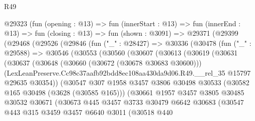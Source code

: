 \begin{lexlean}{R49}
\begin{coremodule}
      @29323
        (fun (opening : @13) =>
        fun (innerStart : @13) =>
        fun (innerEnd : @13) =>
        fun (closing : @13) =>
        fun (shown : @3091) =>
        @29371
          (@29399
            (@29468
              (@29526
                (@29846
                  (fun ("_" : @28427) =>
                  @30336
                    (@30478
                      (fun ("_" : @29588) =>
                      @30546
                        (@30553
                          (@30560
                            (@30607
                              (@30613
                                (@30619
                                  (@30631
                                    (@30637
                                      (@30648
                                        (@30660 (@30672 (@30678 @30683 @30600)))
                                        (LexLeanPreserve.Cc98c37aafb92bdd8ec108aa430da9d06.R49.__rel_35
                                          @15797
                                          @29635
                                          @30354))
                                      (@30547
                                        @307
                                        @1958
                                        @3457
                                        @3806
                                        @30498
                                        @30533
                                        (@30582 @165 @30498 (@3628 (@30585 @165)))
                                        (@30661
                                          @1957
                                          @3457
                                          @3805
                                          @30485
                                          @30532
                                          @30671
                                          (@30673
                                            @445
                                            @3457
                                            @3733
                                            @30479
                                            @6642
                                            @30683
                                            (@30547
                                              @443
                                              @315
                                              @3459
                                              @3457
                                              @6640
                                              @3011
                                              (@30518
                                                @440

\end{coremodule}
\end{lexlean}
